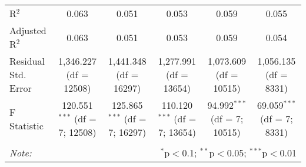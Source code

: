 \begin{table}[!htbp]
\begin{tabular}{@{\extracolsep{3pt}}lccccc}
R$^{2}$ & 0.063 & 0.051 & 0.053 & 0.059 & 0.055 \\ 
Adjusted R$^{2}$ & 0.063 & 0.051 & 0.053 & 0.059 & 0.054 \\ 
Residual Std. Error & 1,346.227 (df = 12508) & 1,441.348 (df = 16297) & 1,277.991 (df = 13654) & 1,073.609 (df = 10515) & 1,056.135 (df = 8331) \\ 
F Statistic & 120.551$^{***}$ (df = 7; 12508) & 125.865$^{***}$ (df = 7; 16297) & 110.120$^{***}$ (df = 7; 13654) & 94.992$^{***}$ (df = 7; 10515) & 69.059$^{***}$ (df = 7; 8331) \\ 
\hline 
\hline \\[-1.8ex] 
\textit{Note:}  & \multicolumn{5}{r}{$^{*}$p$<$0.1; $^{**}$p$<$0.05; $^{***}$p$<$0.01} \\ 
\end{tabular} 
\end{table} 
